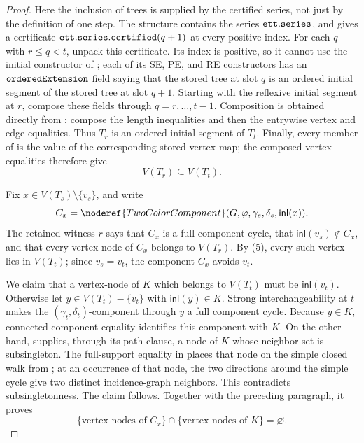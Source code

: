 \begin{proof}
Here the inclusion of trees is supplied by the certified series, not just
by the definition of one step.  The structure
 contains the series
\({\tt ett.series}\), and  gives a certificate
\({\tt ett.series.certified}(q+1)\) at every positive index.  For each
\(q\) with \(r\le q<t\), unpack this certificate.  Its index is positive,
so it cannot use the initial constructor of
; each of its SE, PE, and RE constructors has
an \({\tt orderedExtension}\) field saying that the stored tree at slot
\(q\) is an ordered initial segment of the stored tree at slot \(q+1\).
Starting with the reflexive initial segment at \(r\), compose these fields
through \(q=r,\ldots,t-1\).  Composition is obtained directly from
: compose the length inequalities and
then the entrywise vertex and edge equalities.  Thus \(T_r\) is an ordered
initial segment of \(T_t\).  Finally, every member of
 is the value of the corresponding stored
vertex map; the composed vertex equalities therefore give
\[
                         V(T_r)\subseteq V(T_t).                \tag{5}
\]

Fix \(x\in V(T_s)\setminus\{v_s\}\), and write
\[
 C_x=\noderef{TwoColorComponent}(G,\varphi,
           \gamma_s,\delta_s,\mathsf{inl}(x)).
\]
The retained witness \(r\) says that \(C_x\) is a full component cycle,
that \(\mathsf{inl}(v_s)\notin C_x\), and that every vertex-node of
\(C_x\) belongs to \(V(T_r)\).  By (5), every such vertex lies in
\(V(T_t)\); since \(v_s=v_t\), the component \(C_x\) avoids \(v_t\).

We claim that a vertex-node of \(K\) which belongs to \(V(T_t)\) must be
\(\mathsf{inl}(v_t)\).  Otherwise let
\(y\in V(T_t)-\{v_t\}\) with \(\mathsf{inl}(y)\in K\).
Strong interchangeability at \(t\) makes the
\((\gamma_t,\delta_t)\)-component through \(y\) a full component cycle.
Because \(y\in K\), connected-component equality identifies this
component with \(K\).  On the other hand,
 supplies, through its path
clause, a node of \(K\) whose neighbor
set is subsingleton.  The full-support equality in
 places that node on the simple closed
walk from ; at an occurrence of that node, the two
directions around the simple cycle give two distinct incidence-graph
neighbors.  This contradicts subsingletonness.  The claim follows.
Together with the preceding paragraph, it proves
\[
 \{\text{vertex-nodes of }C_x\}\cap
 \{\text{vertex-nodes of }K\}=\varnothing.                    \tag{6}
\]


\end{proof}

